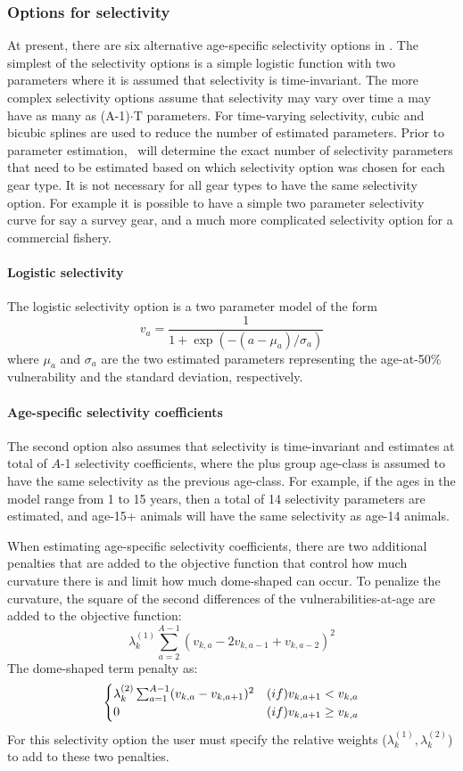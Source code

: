 

\subsubsection{Options for selectivity}\label{ModelDocSelectivity}

At present, there are six alternative age-specific selectivity options in \iscam.  The simplest of the selectivity options is a simple logistic function with two parameters where it is assumed that selectivity is time-invariant.  The more complex selectivity options assume that selectivity may vary over time a may have as many as (A-1)$\cdot$T parameters.  For time-varying selectivity, cubic and bicubic splines are used to reduce the number of estimated parameters.  Prior to parameter estimation, \iscam\ will determine the exact number of selectivity parameters that need to be estimated based on which selectivity option was chosen for each gear type.  It is not necessary for all gear types to have the same selectivity option.  For example it is possible to have a simple two parameter selectivity curve for say a survey gear, and a much more complicated selectivity option for a commercial fishery.

\paragraph{Logistic selectivity} 
The logistic selectivity option is a two parameter model of the form
\[
v_a = \frac{1}{1+ \exp{(-(a-\mu_{a})/\sigma_a)}}
\]
where $\mu_a$ and $\sigma_a$ are the two estimated parameters representing the age-at-50\% vulnerability and the standard deviation, respectively.

\paragraph{Age-specific selectivity coefficients}
The second option also assumes that selectivity is time-invariant and estimates at total of $A$-1 selectivity coefficients, where the plus group age-class is assumed to have the same selectivity as the previous age-class.  For example, if the ages in the model range from 1 to 15 years, then a total of 14 selectivity parameters are estimated, and age-15+ animals will have the same selectivity as age-14 animals.

When estimating age-specific selectivity coefficients, there are two additional penalties that are added to the objective function that control how much curvature there is and limit how much dome-shaped can occur.  To penalize the curvature, the square of the second differences of the vulnerabilities-at-age are added to the objective function: 
\[
\lambda_k^{(1)} \sum_{a=2}^{A-1}(v_{k,a} - 2v_{k,a-1} + v_{k,a-2})^2
\]
The dome-shaped term penalty as:
\[
\begin{cases}
\lambda_k^{(2)} \sum_{a=1}^{A-1}(v_{k,a} - v_{k,a+1})^2& \mbox(if) v_{k,a+1}< v_{k,a}\\
0 & \mbox(if) v_{k,a+1}\geq v_{k,a}
\end{cases}
\]
For this selectivity option the user must specify the relative weights ($\lambda_k^{(1)},\lambda_k^{(2)}$) to add to these two penalties.

